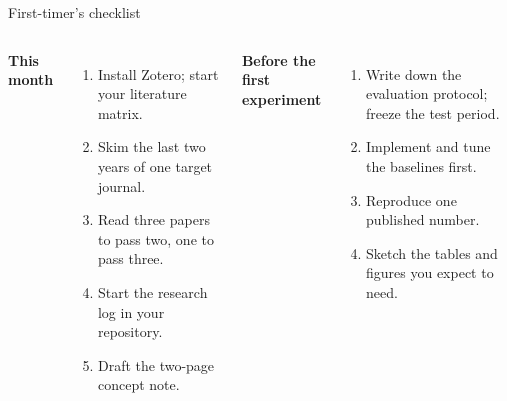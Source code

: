 \documentclass[aspectratio=169,11pt,t]{beamer}
\begin{document}
\begin{frame}{First-timer's checklist}
  \begin{columns}[T,onlytextwidth]
    \textbf{This month}
    \begin{enumerate}
      \item Install Zotero; start your literature matrix.
      \item Skim the last two years of one target journal.
      \item Read three papers to pass two, one to pass three.
      \item Start the research log in your repository.
      \item Draft the two-page concept note.
    \end{enumerate}
    \textbf{Before the first experiment}
    \begin{enumerate}
      \item Write down the evaluation protocol; freeze the test period.
      \item Implement and tune the baselines first.
      \item Reproduce one published number.
      \item Sketch the tables and figures you expect to need.
    \end{enumerate}
  \end{columns}

  \smallskip
\end{frame}
\end{document}
